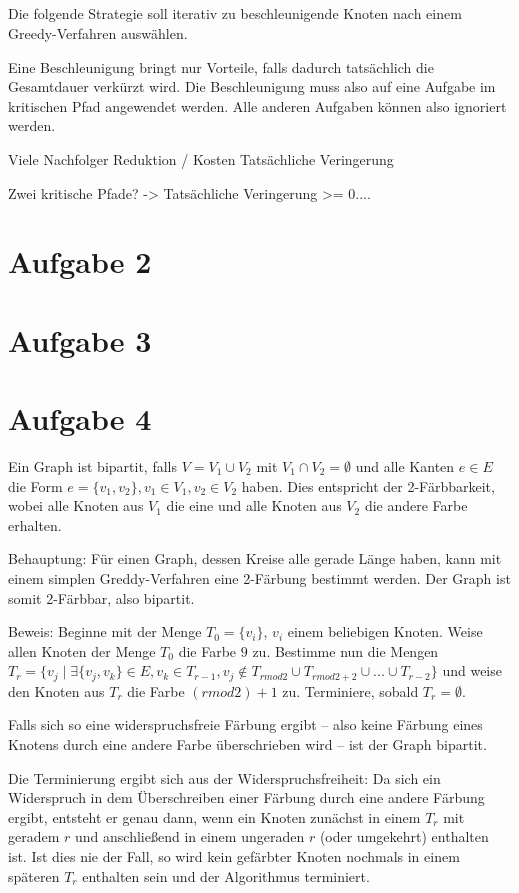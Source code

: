 \documentclass[a4paper]{article}
\begin{document}
\subsection{}
Die folgende Strategie soll iterativ zu beschleunigende Knoten nach einem
Greedy-Verfahren auswählen.

Eine Beschleunigung bringt nur Vorteile, falls dadurch tatsächlich die
Gesamtdauer verkürzt wird. Die Beschleunigung muss also auf eine Aufgabe im
kritischen Pfad angewendet werden. Alle anderen Aufgaben können also
ignoriert werden.

Viele Nachfolger
Reduktion / Kosten
Tatsächliche Veringerung

Zwei kritische Pfade? -> Tatsächliche Veringerung >= 0....

\section{Aufgabe 2}
\section{Aufgabe 3}

\section{Aufgabe 4}
Ein Graph ist bipartit, falls $V = V_1 \cup V_2$ mit $V_1 \cap V_2 = \emptyset$
und alle Kanten $e \in E$ die Form $e = \{v_1, v_2\}, v_1 \in V_1, v_2 \in
V_2$ haben. Dies entspricht der 2-Färbbarkeit, wobei alle Knoten aus $V_1$
die eine und alle Knoten aus $V_2$ die andere Farbe erhalten.

Behauptung: Für einen Graph, dessen Kreise alle gerade Länge haben, kann mit einem simplen Greddy-Verfahren
eine 2-Färbung bestimmt werden. Der Graph ist somit 2-Färbbar, also
bipartit.

Beweis:
Beginne mit der Menge $T_0 = \{v_i\}$, $v_i$ einem beliebigen Knoten.
Weise allen Knoten der Menge $T_0$ die Farbe $9$ zu.
Bestimme nun die Mengen $T_r = \{ v_j \mid \exists \{ v_j, v_k \} \in E, v_k
\in T_{r-1}, v_j \not\in T_{r mod 2} \cup T_{r mod 2 + 2} \cup ... \cup
T_{r-2} \}$ und weise den Knoten aus $T_r$ die Farbe $(r mod 2) + 1$ zu.
Terminiere, sobald $T_r = \emptyset$.

Falls sich so eine widerspruchsfreie Färbung ergibt -- also keine Färbung
eines Knotens durch eine andere Farbe überschrieben wird -- ist der Graph
bipartit.

Die Terminierung ergibt sich aus der Widerspruchsfreiheit: Da sich ein
Widerspruch in dem Überschreiben einer Färbung durch eine andere Färbung
ergibt, entsteht er genau dann, wenn ein Knoten zunächst in einem $T_r$ mit
geradem $r$ und anschließend in einem ungeraden $r$ (oder umgekehrt)
enthalten ist. Ist dies nie der Fall, so wird kein gefärbter Knoten nochmals
in einem späteren $T_r$ enthalten sein und der Algorithmus terminiert.
\end{document}
